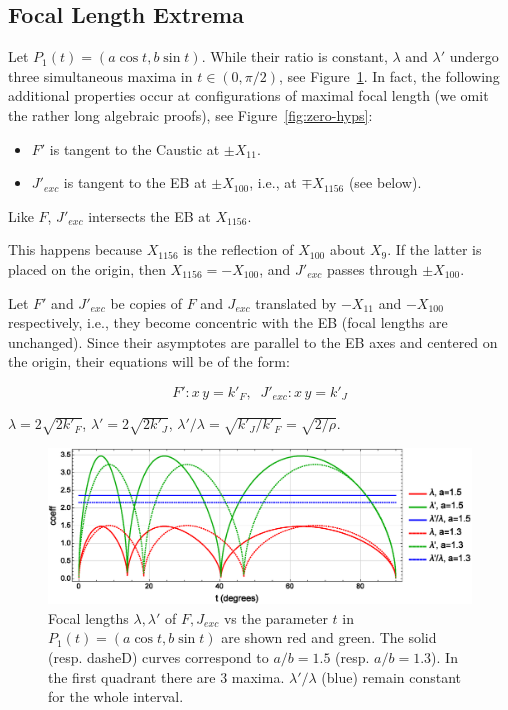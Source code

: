 \subsection{Focal Length Extrema}

Let $P_1(t)=(a\cos{t},b\sin{t})$. While their ratio is constant, $\lambda$ and $\lambda'$ undergo three simultaneous maxima in $t\in(0,\pi/2)$, see Figure~\ref{fig:focal-ratio}. In fact, the following additional properties occur at configurations of maximal focal length (we omit the rather long algebraic proofs), see Figure~\ref{fig:zero-hyps}:

\begin{itemize}
    \item $F'$ is tangent to the Caustic at ${\pm}X_{11}$.
    \item $J'_{exc}$ is tangent to the EB at ${\pm}X_{100}$, i.e., at ${\mp}X_{1156}$ (see below).
\end{itemize}

\begin{remark}
Like $F$, $J'_{exc}$ intersects the EB at $X_{1156}$.
\end{remark}

This happens because $X_{1156}$ is the reflection of $X_{100}$ about $X_9$. If the latter is placed on the origin, then $X_{1156}=-X_{100}$, and $J'_{exc}$ passes through ${\pm}X_{100}$.

Let $F'$ and $J'_{exc}$ be copies of $F$ and $J_{exc}$ translated by $-X_{11}$ and $-X_{100}$ respectively, i.e., they become concentric with the EB (focal lengths are unchanged). Since their asymptotes are parallel to the EB axes and centered on the origin, their equations will be of the form:

\[
F': x\,y = k'_F,\;\;J'_{exc}: x\,y = k'_J
\]

\begin{remark}
$\lambda=2\sqrt{2k'_F}$, $\lambda'=2\sqrt{2k'_J}$, $\lambda'/\lambda=\sqrt{k'_J/k'_F}=\sqrt{2/\rho}$.
\end{remark} 

\begin{figure}
    \centering
    \includegraphics[width=\textwidth]{pics_eps_new/0110_hyp_focals.eps}
    \caption{Focal lengths $\lambda,\lambda'$ of $F,J_{exc}$ vs the parameter $t$ in $P_1(t)=(a\cos{t},b\sin{t})$ are shown red and green. The solid (resp. dasheD) curves correspond to $a/b=1.5$ (resp. $a/b=1.3$). In the first quadrant there are 3 maxima. $\lambda'/\lambda$ (blue) remain constant for the whole interval.}
    \label{fig:focal-ratio}
\end{figure}

